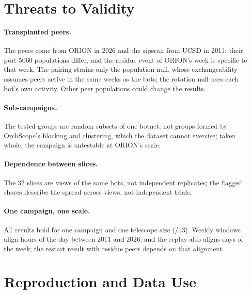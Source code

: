 \documentclass[11pt]{article}
\newcommand{\sysname}{OrchScope}
\begin{document}
\section{Threats to Validity}
\label{sec:threats}

\paragraph{Transplanted peers.} The peers come from ORION in 2026 and the sipscan from UCSD in
2011; their port-5060 populations differ, and the residue event of ORION's week is specific to
that week. The pairing strains only the population null, whose exchangeability assumes peers
active in the same weeks as the bots; the rotation null uses each bot's own activity. Other peer
populations could change the results.

\paragraph{Sub-campaigns.} The tested groups are random subsets of one botnet, not groups formed by
\sysname's blocking and clustering, which the dataset cannot exercise; taken whole, the campaign is
untestable at ORION's scale.

\paragraph{Dependence between slices.} The 32 slices are views of the same bots, not independent
replicates; the flagged shares describe the spread across views, not independent trials.

\paragraph{One campaign, one scale.} All results hold for one campaign and one telescope size
(/13). Weekly windows align hours of the day between 2011 and 2026, and the replay also aligns
days of the week; the restart result with residue peers depends on that alignment.

\section{Reproduction and Data Use}
\label{sec:repro}
\end{document}
